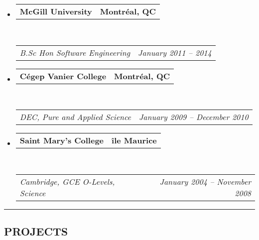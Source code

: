 \documentclass[10pt,letterpaper]{article}
\makeatletter
\newcommand{\headerrow}[2]
{\begin{tabular*}{\linewidth}{l@{\extracolsep{\fill}}r}
	#1 &
	#2 \\
\end{tabular*}}
\makeatother
\begin{document}
\begin{itemize}
	\parskip=0.1em

	\item
	\headerrow
		{\textbf{McGill University}}
		{\textbf{Montr\'{e}al, QC}}
	\\
	\headerrow
		{\emph{B.Sc Hon Software Engineering}}
		{\emph{January 2011 -- 2014}}

	\item
	\headerrow
		{\textbf{C\'{e}gep Vanier College}}
		{\textbf{Montr\'{e}al, QC}}
	\\
	\headerrow
		{\emph{DEC, Pure and Applied Science}}
		{\emph{January 2009 -- December 2010}}

	\item
	\headerrow
		{\textbf{Saint Mary's College}}
		{\textbf{\^{i}le Maurice}}
	\\
	\headerrow
		{\emph{Cambridge, GCE O-Levels, Science}}
		{\emph{January 2004 -- November 2008}}
\end{itemize}


\hrule
\vspace{-0.4em}
\subsection*{PROJECTS}
\end{document}
